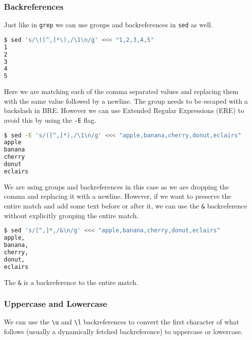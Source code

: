 \subsubsection{Backreferences}

Just like in \lstinline|grep| we can use groups and backreferences in \lstinline|sed| as well.

\begin{lstlisting}[language=bash]
$ sed 's/\([^,]*\),/\1\n/g' <<< "1,2,3,4,5"
1
2
3
4
5
\end{lstlisting}

Here we are matching each of the comma separated values and replacing them with the same value followed by a newline.
The group needs to be escaped with a backslash in BRE.
However we can use Extended Regular Expressions (ERE) to avoid this by using the \lstinline|-E| flag.

\begin{lstlisting}[language=bash]
$ sed -E 's/([^,]*),/\1\n/g' <<< "apple,banana,cherry,donut,eclairs"
apple
banana
cherry
donut
eclairs
\end{lstlisting}

We are using groups and backreferences in this case as we are dropping the comma and replacing it with a newline.
However, if we want to preserve the entire match and add some text before or after it, we can use the \lstinline|&| backreference without explicitly grouping the entire match.

\begin{lstlisting}[language=bash]
$ sed 's/[^,]*,/&\n/g' <<< "apple,banana,cherry,donut,eclairs"
apple,
banana,
cherry,
donut,
eclairs
\end{lstlisting}

\begin{remark}
  The \lstinline|&| is a backreference to the entire match.
\end{remark}

\subsubsection{Uppercase and Lowercase}

We can use the \lstinline|\u| and \lstinline|\l| backreferences to convert the first character of what follows (usually a dynamically fetched backreference) to uppercase or lowercase.

